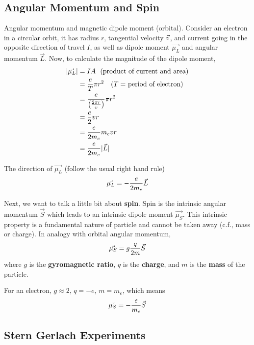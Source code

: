 \documentclass[english, 11pt]{article}
\begin{document}
     \subsection{Angular Momentum and Spin}

       Angular momentum and magnetic dipole moment (orbital). Consider an electron in a circular orbit, it has radius $r$, tangential velocity ${\vec{v}}$, and current going in the opposite direction of travel $I$, as well as dipole moment $\vec{\mu_L}$ and angular momentum $\vec{L}$. Now, to calculate the magnitude of the dipole moment,
       \begin{align*}
         |\vec{\mu_L}| & = IA \mbox{\ \ (product of current and area)} \\
                       & = \frac{e}{T} \pi r^2 \mbox{ \ \ ($T =$ period of electron)} \\
                       & = \frac{e}{\left( \frac{2 \pi r}{v} \right)} \pi r^2 \\
                       & = \frac{e}{2} vr \\
                       & = \frac{e}{2m_e} m_evr \\
                       & = \frac{e}{2m_e} |\vec{L}|
       \end{align*}

       The direction of $\vec{\mu_L}$ (follow the usual right hand rule)
       \[ \vec{\mu_L} = -\frac{e}{2m_e} \vec{L} \]

       Next, we want to talk a little bit about \textbf{spin}. Spin is the intrinsic angular momentum $\vec{S}$ which leads to an intrinsic dipole moment $\vec{\mu_S}$. This intrinsic property is a fundamental nature of particle and cannot be taken away (c.f., mass or charge). In analogy with orbital angular momentum,
       \[ \vec{\mu_S} = g\frac{q}{2m} \vec{S} \]
       where $g$ is the \textbf{gyromagnetic ratio}, $q$ is the \textbf{charge}, and $m$ is the \textbf{mass} of the particle.
       \newline

       For an electron, $g \approx 2$, $q = -e$, $m = m_e$, which means
       \[ \vec{\mu_S} = -\frac{e}{m_e} \vec{S} \]

     \subsection{Stern Gerlach Experiments}
\end{document}
